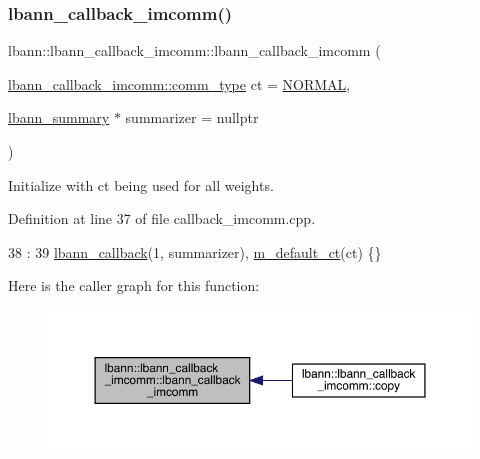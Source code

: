 \subsubsection{\texorpdfstring{lbann\+\_\+callback\+\_\+imcomm()}{lbann\_callback\_imcomm()}\hspace{0.1cm}{\footnotesize\ttfamily [1/3]}}
{\footnotesize\ttfamily lbann\+::lbann\+\_\+callback\+\_\+imcomm\+::lbann\+\_\+callback\+\_\+imcomm (\begin{DoxyParamCaption}\item[{\hyperlink{classlbann_1_1lbann__callback__imcomm_acf7e894b3381e7f9b71020dc73594d6a}{lbann\+\_\+callback\+\_\+imcomm\+::comm\+\_\+type}}]{ct = {\ttfamily \hyperlink{classlbann_1_1lbann__callback__imcomm_acf7e894b3381e7f9b71020dc73594d6aa5f19efb5bef79cea24be992a2137962e}{N\+O\+R\+M\+AL}},  }\item[{\hyperlink{classlbann_1_1lbann__summary}{lbann\+\_\+summary} $\ast$}]{summarizer = {\ttfamily nullptr} }\end{DoxyParamCaption})}

Initialize with ct being used for all weights. 

Definition at line 37 of file callback\+\_\+imcomm.\+cpp.


\begin{DoxyCode}
38                                :
39   \hyperlink{classlbann_1_1lbann__callback_a679057298a41ddd47f08c157f756c584}{lbann\_callback}(1, summarizer), \hyperlink{classlbann_1_1lbann__callback__imcomm_ac3df687b12721a7278877c303357bc09}{m\_default\_ct}(ct) \{\}
\end{DoxyCode}
Here is the caller graph for this function\+:\nopagebreak
\begin{figure}[H]
\begin{center}
\leavevmode
\includegraphics[width=350pt]{classlbann_1_1lbann__callback__imcomm_a06dc9efdcd77c9e1cf714ecf709a6e3a_icgraph}
\end{center}
\end{figure}
\mbox{\label{classlbann_1_1lbann__callback__imcomm_a95ae70dd6a90c023ee3bd0638dc24888}} 
